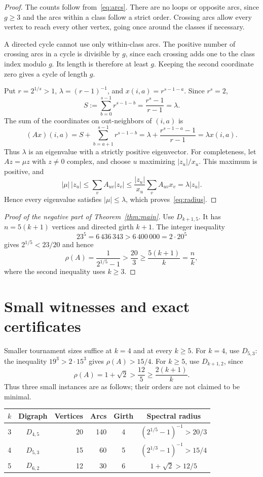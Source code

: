 \documentclass[11pt]{article}
\begin{document}
\begin{proof}
The counts follow from~\eqref{eq:arcs}. There are no loops or opposite arcs, since $g\geq3$ and the arcs within a class follow a strict order. Crossing arcs allow every vertex to reach every other vertex, going once around the classes if necessary.

A directed cycle cannot use only within-class arcs. The positive number of crossing arcs in a cycle is divisible by $g$, since each crossing adds one to the class index modulo $g$. Its length is therefore at least $g$. Keeping the second coordinate zero gives a cycle of length $g$.

Put $r=2^{1/s}>1$, $\lambda=(r-1)^{-1}$, and $x(i,a)=r^{s-1-a}$. Since $r^s=2$,
\[
 S:=\sum_{b=0}^{s-1}r^{s-1-b}
 =\frac{r^s-1}{r-1}=\lambda.
\]
The sum of the coordinates on out-neighbors of $(i,a)$ is
\[
 (Ax)(i,a)=S+\sum_{b=a+1}^{s-1}r^{s-1-b}
 =\lambda+\frac{r^{s-1-a}-1}{r-1}
 =\lambda x(i,a).
\]
Thus $\lambda$ is an eigenvalue with a strictly positive eigenvector.
For completeness, let $Az=\mu z$ with $z\neq0$ complex, and choose $u$ maximizing $|z_u|/x_u$. This maximum is positive, and
\[
 |\mu|\,|z_u|\leq\sum_v A_{uv}|z_v|
 \leq\frac{|z_u|}{x_u}\sum_v A_{uv}x_v
 =\lambda|z_u|.
\]
Hence every eigenvalue satisfies $|\mu|\leq\lambda$, which proves~\eqref{eq:radius}.
\end{proof}

\begin{proof}[Proof of the negative part of Theorem~\ref{thm:main}]
Use $D_{k+1,5}$. It has $n=5(k+1)$ vertices and directed girth $k+1$. The integer inequality
\[
 23^5=6\,436\,343>6\,400\,000=2\cdot20^5
\]
gives $2^{1/5}<23/20$ and hence
\[
 \rho(A)=\frac{1}{2^{1/5}-1}>\frac{20}{3}
 \geq\frac{5(k+1)}{k}=\frac nk,
\]
where the second inequality uses $k\geq3$.
\end{proof}

\section{Small witnesses and exact certificates}

Smaller tournament sizes suffice at $k=4$ and at every $k\geq5$. For $k=4$, use $D_{5,3}$: the inequality $19^3>2\cdot15^3$ gives $\rho(A)>15/4$. For $k\geq5$, use $D_{k+1,2}$, since
\[
 \rho(A)=1+\sqrt2>\frac{12}{5}
 \geq\frac{2(k+1)}{k}.
\]
Thus three small instances are as follows; their orders are not claimed to be minimal.
\begin{center}
\begin{tabular}{ccrrcc}
\toprule
$k$ & Digraph & Vertices & Arcs & Girth & Spectral radius\\
\midrule
3 & $D_{4,5}$ &20&140&4&$(2^{1/5}-1)^{-1}>20/3$\\
4 & $D_{5,3}$ &15&60&5&$(2^{1/3}-1)^{-1}>15/4$\\
5 & $D_{6,2}$ &12&30&6&$1+\sqrt2>12/5$\\
\bottomrule
\end{tabular}
\end{center}
\end{document}
